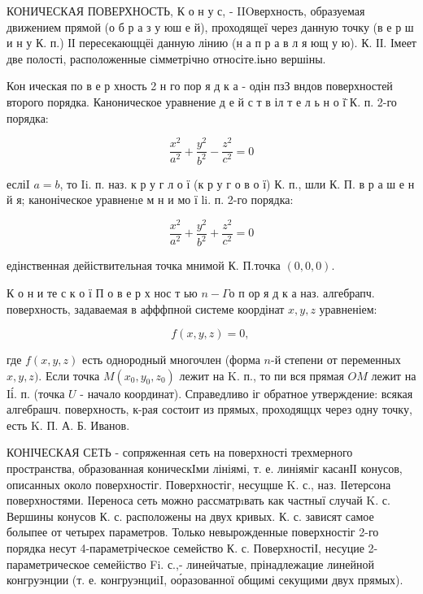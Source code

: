 \documentclass[10pt]{article}
\begin{document}
КОНИЧЕСКАЯ ПОВЕРХНОСТЬ, К о н у с, - IIOверхность, образуемая движением прямой (о б р а з у юш е й), проходящеї через данную точку (в е р ш и н у К. п.) ІІ пересекающцёі данную лінию (н а п р а в л я ющ у ю). К. ІІ. Імеет две полості, расположенные сімметрічно относіте.іьно вершіны.



Кон ическая по в е р хность 2 н го пор я д к а - одін пзЗ вндов поверхностей второго порядка. Каноническое уравнение д е й с т в іл т е л ь н о ї̈ К. п. 2-го порядка:



\[

\frac{x^{2}}{a^{2}}+\frac{y^{2}}{b^{2}}-\frac{z^{2}}{c^{2}}=0

\]



есліI $a=b$, то Ii. п. наз. к р у г л о ї (к р у г о в о ї) К. п., шли К. П. в р а ш е н й я; каноніческое уравненıе м н и мо ї li. п. 2-го порядка:



\[

\frac{x^{2}}{a^{2}}+\frac{y^{2}}{b^{2}}+\frac{z^{2}}{c^{2}}=0

\]



едінственная дейіствительная точка мнимой К. П.точка $(0,0,0)$.



К о н и те с к о ї П о в е р х нос т ью $n-\Gamma о$ п ор я д к а наз. алгебрапч. поверхность, задаваемая в афффпноӥ системе коордінат $x, y, z$ уравненіем:



\[

f(x, y, z)=0 \text {, }

\]



где $f(x, y, z)$ есть однородный многочлен (форма $n$-й степени от переменных $x, y, z)$. Если точка $M\left(x_{0}, y_{0}, z_{0}\right)$ лежит на $\mathrm{K}$. п., то пи вся прямая $O M$ лежит на Iі́. п. (точка $U$ - начало координат). Справедливо іг обратное утверждение: всякая алгебрашч. поверхность, к-рая состоит из прямых, проходящцх через одну точку, есть K. П. А. Б. Иванов.



КОНІЧЕСКАЯ СЕТЬ - сопряженная сеть на поверхності трехмерного пространства, образованная коническІми лініямі, т. е. линіяміг касанІІ конусов, описанных около поверхностіг. Поверхностіг, несущше K. с., наз. ІІетерсона поверхностями. ІІереноса сеть можно рассматрıвать как частныї случай $\mathrm{K}$. с. Вершины конусов К. с. расположены на двух кривых. К. с. зависят самое болыпее от четырех параметров. Только невырожденные поверхностіг 2-го порядка несут 4-параметріческое семейство К. с. ПоверхностіІ, несуцие 2-параметрическое семейіство Fi. с.,- линеӥчатые, прінадлежацие линейной конгруэнции (т. е. конгруэнциіI, оо́разованної общимі секущими двух прямых).
\end{document}
